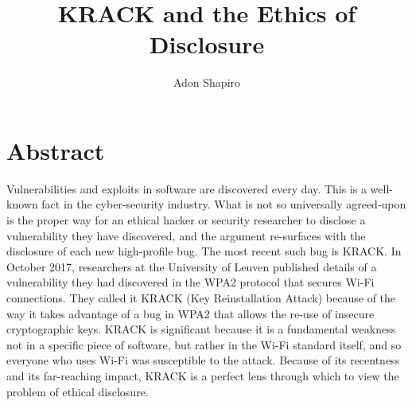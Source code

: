 \documentclass[12pt]{article}
\title{KRACK and the Ethics of Disclosure}
\author{Adon Shapiro}
\begin{document}
\maketitle
\section*{Abstract}
Vulnerabilities and exploits in software are discovered every day. This is a
well-known fact in the cyber-security industry. What is not so universally
agreed-upon is the proper way for an ethical hacker or security researcher to
disclose a vulnerability they have discovered, and the argument re-surfaces
with the disclosure of each new high-profile bug. The most recent such bug 
is KRACK.
In October 2017, researchers at the University of Leuven published details
of a vulnerability they had discovered in the WPA2 protocol that secures Wi-Fi
connections. They called it KRACK (Key Reinstallation Attack) because of the
way it takes advantage of a bug in WPA2 that allows the re-use of insecure
cryptographic keys. KRACK is significant because it is a fundamental weakness
not in a specific piece of software, but rather in the Wi-Fi standard itself,
and so everyone who uses Wi-Fi was susceptible to the attack. Because of its
recentness and its far-reaching impact, KRACK is a perfect lens through which
to view the problem of ethical disclosure.

%
\end{document}
